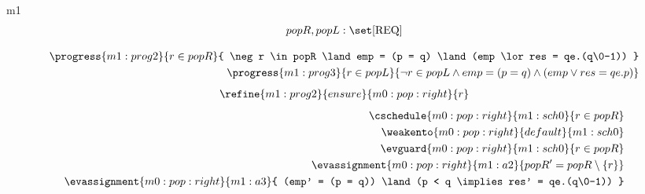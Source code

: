 \documentclass[12pt]{amsart}
\begin{document}
\begin{machine}{m1}
\begin{align*}
\variable{ popR, popL : \set [\REQ]}
\end{align*}

\begin{align*}
\progress{m1:prog2}{ r \in popR }{ \neg r \in popR \land emp = (p = q) \land (emp \lor res = qe.(q\0-1))  }
\\ \progress{m1:prog3}{ r \in popL }{ \neg r \in popL \land emp = (p = q) \land (emp \lor res = qe.p)  }
\end{align*}
\begin{align*}
\refine{m1:prog2}{ensure}{m0:pop:right}{ \index{r}{r} }
\end{align*}
\begin{align*}
\cschedule{m0:pop:right}{m1:sch0}{ r \in popR }
\\ \weakento{m0:pop:right}{default}{m1:sch0}
\\ \evguard{m0:pop:right}{m1:sch0}{ r \in popR }
\\ \evassignment{m0:pop:right}{m1:a2}{ popR' = popR \setminus \{ r \} }
\\ \evassignment{m0:pop:right}{m1:a3}{ (emp' = (p = q)) \land (p < q \implies res' = qe.(q\0-1)) }
\end{align*}

\end{machine}
 

\end{document}
